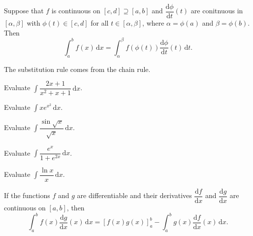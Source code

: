 \documentclass[11pt]{article}
\theoremstyle{break}
\theoremstyle{no_label}
\newcommand{\derivative}[2]{\dfrac{\dd{#1}}{\dd{#2}}}
\newcommand{\dd}{\text{d}}
\newcommand{\ddi}{\text{$\,$d}}
\numberwithin{equation}{theorem}
\begin{document}
\begin{theorem}
    Suppose that $f$ is continuous on $[c, d]\supseteq[a, b]$ and $\derivative{\phi}{t}(t)$ are conitnuous in $[\alpha, \beta]$ with $\phi(t)\in[c, d]$ for all $t\in[\alpha, \beta]$, where $\alpha=\phi(a)$ and $\beta=\phi(b)$. Then $$\int_a^b f(x)\ddi x=\int_{\alpha}^{\beta}f(\phi(t))\derivative{\phi}{t}(t)\ddi t.$$
\end{theorem}

\begin{remark}
    The substitution rule comes from the chain rule.
\end{remark}

\begin{example}
    Evaluate $\displaystyle\int\dfrac{2x+1}{x^2+x+1}\ddi x$.
\end{example}


\begin{example}
    Evaluate $\displaystyle\int x e^{x^2}\ddi x$.
\end{example}


\begin{example}
    Evaluate $\displaystyle\int\dfrac{\sin\sqrt{x}}{\sqrt{x}}\ddi x$.
\end{example}


\begin{example}
    Evaluate $\displaystyle\int\dfrac{e^x}{1+e^{2x}}\ddi x$.
\end{example}


\begin{example}
    Evaluate $\displaystyle\int\dfrac{\ln x}{x}\ddi x$.
\end{example}


\begin{theorem}
    If the functions $f$ and $g$ are differentiable and their derivatives $\derivative{f}{x}$ and $\derivative{g}{x}$ are continuous on $[a, b]$, then $$\int_a^b f(x)\derivative{g}{x}(x)\ddi x=\left[f(x)g(x)\right]_a^b-\int_a^b g(x)\derivative{f}{x}(x)\ddi x.$$
\end{theorem}
\end{document}
